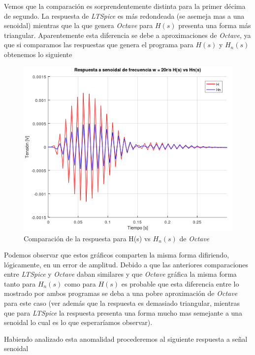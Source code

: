 \documentclass[11pt,a4paper]{report}
\begin{document}
Vemos que la comparación es sorprendentemente distinta para la primer décima de segundo. La respuesta de \textit{LTSpice} es más redondeada (se asemeja mas a una senoidal) mientras que la que genera \textit{Octave} para $H(s)$ presenta una forma más triangular. Aparentemente esta diferencia se debe a aproximaciones de \textit{Octave}, ya que si comparamos las respuestas que genera el programa para $H(s)$ y $H_{n}(s)$ obtenemos lo siguiente
\newpage

\begin{figure}[h!]
\centering
\includegraphics[scale=0.96]{rtaSenoidalBajoComp.png}
\caption{Comparación de la respuesta para H(s) vs $H_{n}(s)$ de \textit{Octave}}
\end{figure}

Podemos observar que estos gráficos comparten la misma forma difiriendo, lógicamente, en un error de amplitud. Debido a que las anteriores comparaciones entre \textit{LTSpice} y \textit{Octave} daban similares y que \textit{Octave} gráfica la misma forma tanto para $H_{n}(s)$ como para $H(s)$ es probable que esta diferencia entre lo mostrado por ambos programas se deba a una pobre aproximación de \textit{Octave} para este caso (ver además que la respuesta es demasiado triangular, mientras que para \textit{LTSpice} la respuesta presenta una forma mucho mas semejante a una senoidal lo cual es lo que esperaríamos observar).

\bigskip
Habiendo analizado esta anomalidad procederemos al siguiente respuesta a señal senoidal
\newpage 
\end{document}
